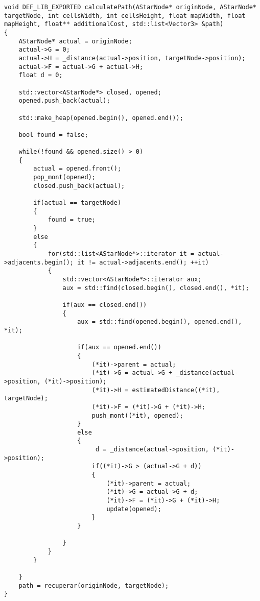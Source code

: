 \begin{verbatim}
void DEF_LIB_EXPORTED calculatePath(AStarNode* originNode, AStarNode* targetNode, int cellsWidth, int cellsHeight, float mapWidth, float mapHeight, float** additionalCost, std::list<Vector3> &path)
{
    AStarNode* actual = originNode;
    actual->G = 0;
    actual->H = _distance(actual->position, targetNode->position);    
    actual->F = actual->G + actual->H;
    float d = 0;

    std::vector<AStarNode*> closed, opened;
    opened.push_back(actual);

    std::make_heap(opened.begin(), opened.end());
    
    bool found = false;

    while(!found && opened.size() > 0)
    {
        actual = opened.front();
        pop_mont(opened);
        closed.push_back(actual);

        if(actual == targetNode)
        {
            found = true;
        }
        else
        {   
            for(std::list<AStarNode*>::iterator it = actual->adjacents.begin(); it != actual->adjacents.end(); ++it)
            {                
                std::vector<AStarNode*>::iterator aux;
                aux = std::find(closed.begin(), closed.end(), *it);

                if(aux == closed.end()) 
                {
                    aux = std::find(opened.begin(), opened.end(), *it);

                    if(aux == opened.end()) 
                    {
                        (*it)->parent = actual;
                        (*it)->G = actual->G + _distance(actual->position, (*it)->position);
                        (*it)->H = estimatedDistance((*it), targetNode);
                        (*it)->F = (*it)->G + (*it)->H;
                        push_mont((*it), opened);
                    }
                    else
                    {
                         d = _distance(actual->position, (*it)->position);
                        if((*it)->G > (actual->G + d))
                        {
                            (*it)->parent = actual;
                            (*it)->G = actual->G + d;
                            (*it)->F = (*it)->G + (*it)->H;
                            update(opened);
                        }
                    }
                    
                }
            }
        }
        
    }
    path = recuperar(originNode, targetNode);
}



\end{verbatim}
